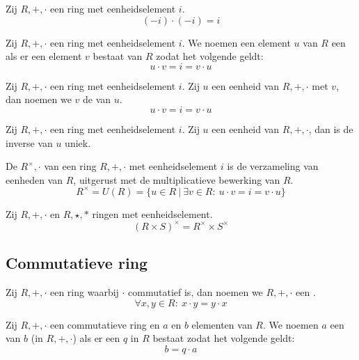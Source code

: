 \documentclass[main.tex]{subfiles}
\begin{document}
\begin{ei}
  Zij $R,+,\cdot$ een ring met eenheidselement $i$.
  \[ (-i) \cdot (-i) = i\]
\end{ei}

\begin{de}
  Zij $R,+,\cdot$ een ring met eenheidselement $i$.
  We noemen een element $u$ van $R$ een  als er een element $v$ bestaat van $R$ zodat het volgende geldt:
  \[ u \cdot v = i = v \cdot u \]
\end{de}

\begin{de}
  Zij $R,+,\cdot$ een ring met eenheidselement $i$.
  Zij $u$ een eenheid van $R,+,\cdot$ met $v$, dan noemen we $v$ de  van $u$.
  \[ u \cdot v = i = v \cdot u \]
\end{de}

\begin{st}
  Zij $R,+,\cdot$ een ring met eenheidselement $i$.
  Zij $u$ een eenheid van $R,+,\cdot$, dan is de inverse van $u$ uniek.
\end{st}

\begin{de}
  De  $R^{\times},\cdot$ van een ring $R,+,\cdot$ met eenheidselement $i$ is de verzameling van eenheden van $R$, uitgerust met de multiplicatieve bewerking van $R$.
  \[ R^{\times} = U(R) = \{ u \in R \ |\ \exists v \in R:\ u \cdot v = i = v \cdot u \} \]
\end{de}

\begin{st}
  Zij $R,+,\cdot$ en $R,\star,*$ ringen met eenheidselement.
  \[ (R \times S)^{\times} = R^{\times}\times S^{\times} \]
\end{st}

\subsection{Commutatieve ring}
\label{sec:commutatieve-rin}

\begin{de}
  Zij $R,+,\cdot$ een ring waarbij $\cdot$ commutatief is, dan noemen we $R,+,\cdot$ een .
  \[ \forall x,y \in R:\ x\cdot y = y \cdot x \]
\end{de}

\begin{de}
  Zij $R,+,\cdot$ een commutatieve ring en $a$ en $b$ elementen van $R$.
  We noemen $a$ een  van $b$ (in $R,+,\cdot$) als er een $q$ in $R$ bestaat zodat het volgende geldt:
  \[ b = q \cdot a \]
\end{de}
\end{document}
